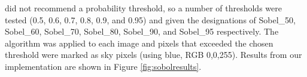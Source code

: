 \documentclass[final,3p,times,authoryear]{elsarticle}
\begin{document}
\cite{Wang2015a} did not recommend a probability threshold, so a number of thresholds were tested (0.5, 0.6, 0.7, 0.8, 0.9, and 0.95) and given the designations of Sobel\_50, Sobel\_60, Sobel\_70, Sobel\_80, Sobel\_90, and Sobel\_95 respectively. The algorithm was applied to each image and pixels that exceeded the chosen threshold were marked as sky pixels (using blue, RGB 0,0,255). Results from our implementation are shown in Figure \ref{fig:sobolresults}. 





	
\end{document}
